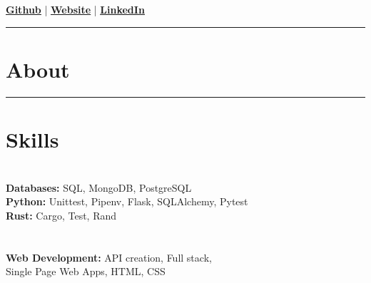 \documentclass[12pt]{IEEEtran}
\newcommand{\cvrule}{\noindent\rule{8.5cm}{0.4pt}}
\begin{document}
\LARGE
{}
\small
\\
\\
{
\color{blue}
\href{https://github.com/dpwdec}{\underline{\textbf{Github}}}
} | {
\color{blue}
 \href{https://dpwdec.github.io}{\underline{\textbf{Website}}}
} | {
\color{blue}
\href{https://www.linkedin.com/in/dec-kolakowski-256b3b86}{\underline{\textbf{LinkedIn}}} 
 }

\cvrule


\section*{\textbf{About}}

\iffalse
\noindent{I am a software developer, a TDD enthusiast and an evangelist for clean code. I graduated with a first class degree from Trinity College in Musical Composition. I spent ten years making games and working on technology-driven art and animation projects. Through using code in these projects I discovered a love for programming and its expressive potential.}
\fi


\cvrule



\section*{\textbf{Skills}}

 \\[3pt]
\textbf{Databases:} SQL, MongoDB, PostgreSQL  \\[3pt]
\textbf{Python:} Unittest, Pipenv, Flask, SQLAlchemy, Pytest  \\[3pt]
\iffalse
\textbf{Adobe Suite:} Photoshop, Illustrator, Premiere  \\[3pt]
\fi
\textbf{Rust:} Cargo, Test, Rand  \\[3pt]
  \\[3pt]
 \\[3pt]
\textbf{Web Development:} API creation, Full stack, \\ Single Page Web Apps, HTML, CSS  %
\end{document}
